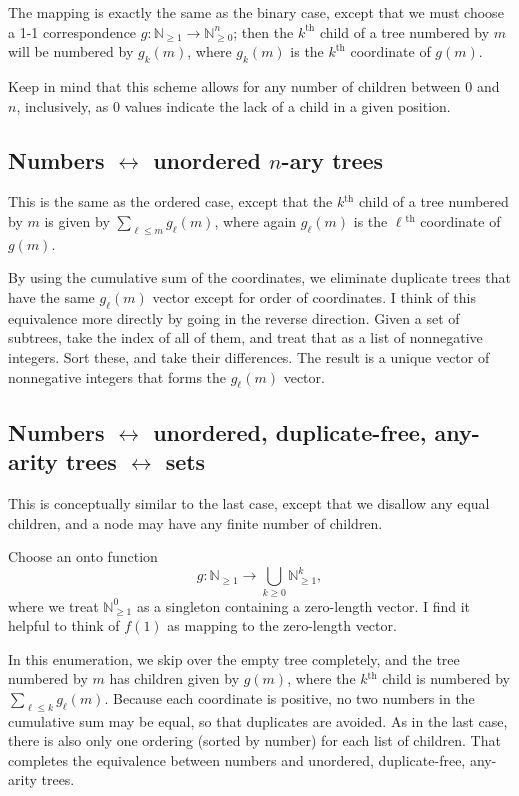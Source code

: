 \documentclass[11pt]{amsart}
\newcommand{\up}[1]{\ensuremath{^{\textrm{#1}}}}
\newcommand\N{\mathbb N}
\begin{document}
The mapping is exactly the same as the binary case, except that
we must choose a 1-1 correspondence $g: \N_{\ge 1} \to \N^n_{\ge 0}$;
then the $k^\text{th}$ child of a tree numbered by $m$ will be
numbered by $g_k(m)$, where $g_k(m)$ is the  $k^\text{th}$ coordinate
of $g(m)$.

Keep in mind that this scheme allows for any number of children
between 0 and $n$, inclusively, as 0 values indicate the lack of a child
in a given position.

\subsection{Numbers $\leftrightarrow$ unordered $n$-ary trees}

This is the same as the ordered case, except that the $k$\up{th} child
of a tree numbered by $m$ is given by $\sum_{\ell \le m} g_\ell(m)$,
where again $g_\ell(m)$ is the $\ell$\up{th} coordinate of $g(m)$.

By using the cumulative sum of the coordinates, we eliminate duplicate
trees that have the same $g_\ell(m)$ vector except for order of coordinates.
I think of this equivalence more directly by going in the reverse direction.
Given a set of subtrees, take the index of all of them, and treat that as a list
of nonnegative integers. Sort these, and take their differences. The result
is a unique vector of nonnegative integers that forms the $g_\ell(m)$ vector.

\subsection{Numbers $\leftrightarrow$ unordered, duplicate-free, any-arity trees $\leftrightarrow$ sets}

This is conceptually similar to the last case, except that we
disallow any equal children, and a node may have any finite number of children.

Choose an onto function
$$ g : \N_{\ge 1} \to \bigcup_{k \ge 0} \N_{\ge 1}^k,$$
where we treat $\N_{\ge 1}^0$ as a singleton containing a zero-length vector.
I find it helpful to think of $f(1)$ as mapping to the zero-length vector.

In this enumeration, we skip over the empty tree completely, and
the tree numbered by $m$ has children given by $g(m)$, where
the $k$\up{th} child is numbered by $\sum_{\ell \le k} g_\ell(m)$.
Because each coordinate is positive, no two numbers in the cumulative
sum may be equal, so that duplicates are avoided. As in the last
case, there is also only one ordering (sorted by number) for each list
of children. That completes the equivalence between numbers and
unordered, duplicate-free, any-arity trees.
\end{document}
